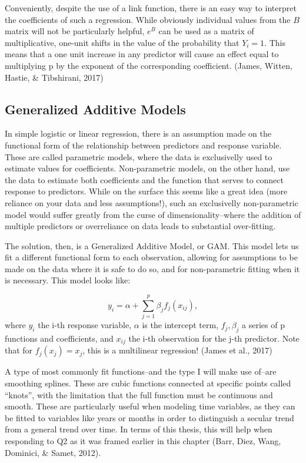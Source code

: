 \documentclass[12pt,twoside]{reedthesis}
\begin{document}
  Conveniently, despite the use of a link function, there is an easy way
  to interpret the coefficients of such a regression. While obviously
  individual values from the \(B\) matrix will not be particularly
  helpful, \(e^B\) can be used as a matrix of multiplicative, one-unit
  shifts in the value of the probability that \(Y_i = 1\). This means that
  a one unit increase in any predictor will cause an effect equal to
  multiplying p by the exponent of the corresponding coefficient. (James,
  Witten, Hastie, \& Tibshirani, 2017)
  
  \subsection{Generalized Additive
  Models}\label{generalized-additive-models}
  
  In simple logistic or linear regression, there is an assumption made on
  the functional form of the relationship between predictors and response
  variable. These are called parametric models, where the data is
  exclusivelly used to estimate values for coefficients. Non-parametric
  models, on the other hand, use the data to estimate both coefficients
  and the function that serves to connect response to predictors. While on
  the surface this seems like a great idea (more reliance on your data and
  less assumptions!), such an exclusivelly non-parametric model would
  suffer greatly from the curse of dimensionality--where the addition of
  multiple predictors or overreliance on data leads to substantial
  over-fitting.
  
  The solution, then, is a Generalized Additive Model, or GAM. This model
  lets us fit a different functional form to each observation, allowing
  for assumptions to be made on the data where it is safe to do so, and
  for non-parametric fitting when it is necessary. This model looks like:
  
  \[y_i = \alpha + \sum_{j = 1}^p \beta_j f_j(x_{ij}),\] where \(y_i\) the
  i-th response variable, \(\alpha\) is the intercept term,
  \(f_j, \beta_j\) a series of p functions and coefficients, and
  \(x_{ij}\) the i-th observation for the j-th predictor. Note that for
  \(f_j(x_j) = x_j\), this is a multilinear regression! (James et al.,
  2017)
  
  A type of most commonly fit functions--and the type I will make use
  of--are smoothing splines. These are cubic functions connected at
  specific points called ``knots'', with the limitation that the full
  function must be continuous and smooth. These are particularly useful
  when modeling time variables, as they can be fitted to variables like
  years or months in order to distinguish a secular trend from a general
  trend over time. In terms of this thesis, this will help when responding
  to Q2 as it was framed earlier in this chapter (Barr, Diez, Wang,
  Dominici, \& Samet, 2012).
  
\end{document}
